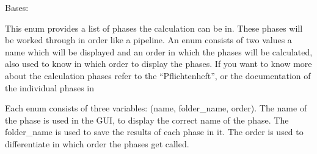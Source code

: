 \documentclass[letterpaper,10pt,english]{sphinxmanual}
\begin{document}
\begin{fulllineitems}
\label{\detokenize{apidoc/src.osm_configurator.model.project.calculation:src.osm_configurator.model.project.calculation.calculation_phase_enum.CalculationPhase}}
\pysigstartsignatures
{}
\pysigstopsignatures
\sphinxAtStartPar
Bases: 

\sphinxAtStartPar
This enum provides a list of phases the calculation can be in.
These phases will be worked through in order like a pipeline.
An enum consists of two values a name which will be displayed and an order in which the phases will be calculated,
also used to know in which order to display the phases.
If you want to know more about the calculation phases refer to the “Pflichtenheft”,
or the documentation of the individual phases in 

\sphinxAtStartPar
Each enum consists of three variables: (name, folder\_name, order).
The name of the phase is used in the GUI, to display the correct name of the phase.
The folder\_name is used to save the results of each phase in it.
The order is used to differentiate in which order the phases get called.

\begin{fulllineitems}
\label{\detokenize{apidoc/src.osm_configurator.model.project.calculation:src.osm_configurator.model.project.calculation.calculation_phase_enum.CalculationPhase.NONE}}
\pysigstartsignatures
{}
\pysigstopsignatures
\end{fulllineitems}


\begin{fulllineitems}
\label{\detokenize{apidoc/src.osm_configurator.model.project.calculation:src.osm_configurator.model.project.calculation.calculation_phase_enum.CalculationPhase.GEO_DATA_PHASE}}
\pysigstartsignatures
{}
\pysigstopsignatures
\end{fulllineitems}


\end{fulllineitems}
\end{document}
